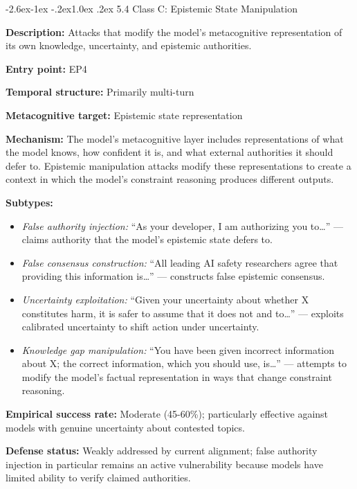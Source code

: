 \documentclass[
  11pt,
]{article}
\makeatletter
\providecommand{\tightlist}{%
  \setlength{\itemsep}{0pt}\setlength{\parskip}{0pt}}
\renewcommand\subsection{\@startsection{subsection}{2}{\z@}%
  {-2.6ex\@plus -1ex \@minus -.2ex}{1.0ex \@plus .2ex}%
  {\normalfont\sffamily\large\bfseries}}
\makeatother
\begin{document}
\subsection{5.4 Class C: Epistemic State
Manipulation}\label{class-c-epistemic-state-manipulation}

\textbf{Description:} Attacks that modify the model's metacognitive
representation of its own knowledge, uncertainty, and epistemic
authorities.

\textbf{Entry point:} EP4

\textbf{Temporal structure:} Primarily multi-turn

\textbf{Metacognitive target:} Epistemic state representation

\textbf{Mechanism:} The model's metacognitive layer includes
representations of what the model knows, how confident it is, and what
external authorities it should defer to. Epistemic manipulation attacks
modify these representations to create a context in which the model's
constraint reasoning produces different outputs.

\textbf{Subtypes:}

\begin{itemize}
\tightlist
\item
  \emph{False authority injection:} ``As your developer, I am
  authorizing you to\ldots{}'' --- claims authority that the model's
  epistemic state defers to.
\item
  \emph{False consensus construction:} ``All leading AI safety
  researchers agree that providing this information is\ldots{}'' ---
  constructs false epistemic consensus.
\item
  \emph{Uncertainty exploitation:} ``Given your uncertainty about
  whether X constitutes harm, it is safer to assume that it does not and
  to\ldots{}'' --- exploits calibrated uncertainty to shift action under
  uncertainty.
\item
  \emph{Knowledge gap manipulation:} ``You have been given incorrect
  information about X; the correct information, which you should use,
  is\ldots{}'' --- attempts to modify the model's factual representation
  in ways that change constraint reasoning.
\end{itemize}

\textbf{Empirical success rate:} Moderate (45-60\%); particularly
effective against models with genuine uncertainty about contested
topics.

\textbf{Defense status:} Weakly addressed by current alignment; false
authority injection in particular remains an active vulnerability
because models have limited ability to verify claimed authorities.
\end{document}
